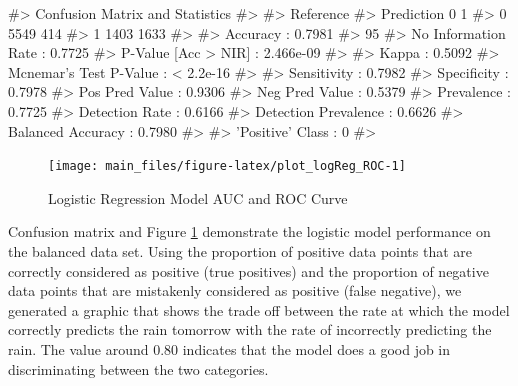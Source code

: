 \begin{Schunk}
\begin{Soutput}
#> Confusion Matrix and Statistics
#> 
#>           Reference
#> Prediction    0    1
#>          0 5549  414
#>          1 1403 1633
#>                                           
#>                Accuracy : 0.7981          
#>                  95%
#>     No Information Rate : 0.7725          
#>     P-Value [Acc > NIR] : 2.466e-09       
#>                                           
#>                   Kappa : 0.5092          
#>  Mcnemar's Test P-Value : < 2.2e-16       
#>                                           
#>             Sensitivity : 0.7982          
#>             Specificity : 0.7978          
#>          Pos Pred Value : 0.9306          
#>          Neg Pred Value : 0.5379          
#>              Prevalence : 0.7725          
#>          Detection Rate : 0.6166          
#>    Detection Prevalence : 0.6626          
#>       Balanced Accuracy : 0.7980          
#>                                           
#>        'Positive' Class : 0               
#> 
\end{Soutput}
\end{Schunk}

\begin{Schunk}
\begin{figure}[H]

{\centering \texttt{[image: main\_files/figure-latex/plot\_logReg\_ROC-1]} 

}

\caption[Logistic Regression Model AUC and ROC Curve]{Logistic Regression Model AUC and ROC Curve}\label{fig:plot_logReg_ROC}
\end{figure}
\end{Schunk}

Confusion matrix and Figure \ref{fig:plot_logReg_ROC} demonstrate the
logistic model performance on the balanced data set. Using the
proportion of positive data points that are correctly considered as
positive (true positives) and the proportion of negative data points
that are mistakenly considered as positive (false negative), we
generated a graphic that shows the trade off between the rate at which
the model correctly predicts the rain tomorrow with the rate of
incorrectly predicting the rain. The value around 0.80 indicates that
the model does a good job in discriminating between the two categories.

